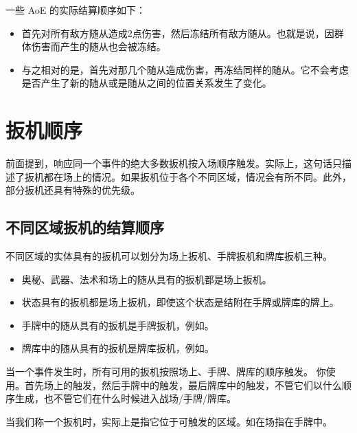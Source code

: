 一些 AoE 的实际结算顺序如下：
\begin{itemize}
    \item {}首先对所有敌方随从造成2点伤害，然后冻结所有敌方随从。也就是说，因群体伤害而产生的随从也会被冻结。
    \item 与之相对的是，首先对那几个随从造成伤害，再冻结同样的随从。它不会考虑是否产生了新的随从或是随从之间的位置关系发生了变化。
\end{itemize}

\section{扳机顺序}

前面提到，响应同一个事件的绝大多数扳机按入场顺序触发。实际上，这句话只描述了扳机都在场上的情况。如果扳机位于各个不同区域，情况会有所不同。此外，部分扳机还具有特殊的优先级。

\subsection{不同区域扳机的结算顺序}
\label{trigger-order-in-different-zone}

不同区域的实体具有的扳机可以划分为场上扳机、手牌扳机和牌库扳机三种。
\begin{itemize}
    \item 奥秘、武器、法术和场上的随从具有的扳机都是场上扳机。
    \item 状态具有的扳机都是场上扳机，即使这个状态是结附在手牌或牌库的牌上。
    \item 手牌中的随从具有的扳机是手牌扳机，例如。
    \item 牌库中的随从具有的扳机是牌库扳机，例如。
\end{itemize}

当一个事件发生时，所有可用的扳机按照场上、手牌、牌库的顺序触发。
\example 你使用。首先场上的触发，然后手牌中的触发，最后牌库中的触发，不管它们以什么顺序生成，也不管它们在什么时候进入战场/手牌/牌库。

当我们称一个扳机时，实际上是指它位于可触发的区域。如在场指在手牌中。

